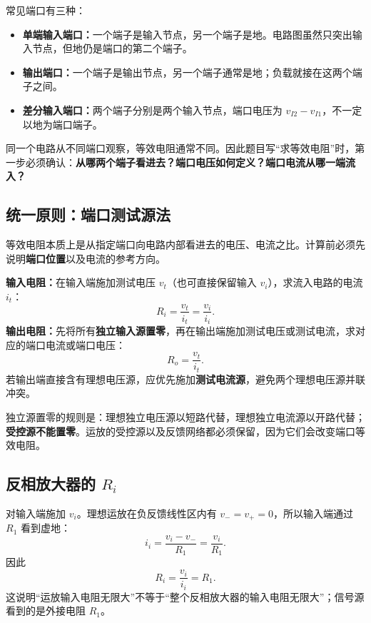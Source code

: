 \documentclass[11pt,fontset=none]{ctexart}
\begin{document}
常见端口有三种：
\begin{itemize}
  \item \textbf{单端输入端口：}一个端子是输入节点，另一个端子是地。电路图虽然只突出输入节点，但地仍是端口的第二个端子。
  \item \textbf{输出端口：}一个端子是输出节点，另一个端子通常是地；负载就接在这两个端子之间。
  \item \textbf{差分输入端口：}两个端子分别是两个输入节点，端口电压为 $v_{I2}-v_{I1}$，不一定以地为端口端子。
\end{itemize}

\begin{warnbox}
同一个电路从不同端口观察，等效电阻通常不同。因此题目写“求等效电阻”时，第一步必须确认：\textbf{从哪两个端子看进去？端口电压如何定义？端口电流从哪一端流入？}
\end{warnbox}

\subsection{统一原则：端口测试源法}

等效电阻本质上是从指定端口向电路内部看进去的电压、电流之比。计算前必须先说明\textbf{端口位置}以及电流的参考方向。

\begin{keybox}
\textbf{输入电阻：}在输入端施加测试电压 $v_t$（也可直接保留输入 $v_i$），求流入电路的电流 $i_t$：
\[
  \boxed{R_i=\frac{v_t}{i_t}=\frac{v_i}{i_i}}.
\]
\textbf{输出电阻：}先将所有\textbf{独立输入源置零}，再在输出端施加测试电压或测试电流，求对应的端口电流或端口电压：
\[
  \boxed{R_o=\frac{v_t}{i_t}}.
\]
若输出端直接含有理想电压源，应优先施加\textbf{测试电流源}，避免两个理想电压源并联冲突。
\end{keybox}

独立源置零的规则是：理想独立电压源以短路代替，理想独立电流源以开路代替；\textbf{受控源不能置零}。运放的受控源以及反馈网络都必须保留，因为它们会改变端口等效电阻。

\subsection{反相放大器的 \texorpdfstring{$R_i$}{Ri}}

对输入端施加 $v_i$。理想运放在负反馈线性区内有 $v_-=v_+=0$，所以输入端通过 $R_1$ 看到虚地：
\[
  i_i=\frac{v_i-v_-}{R_1}=\frac{v_i}{R_1}.
\]
因此
\[
  \boxed{R_i=\frac{v_i}{i_i}=R_1}.
\]
这说明“运放输入电阻无限大”不等于“整个反相放大器的输入电阻无限大”；信号源看到的是外接电阻 $R_1$。
\end{document}
